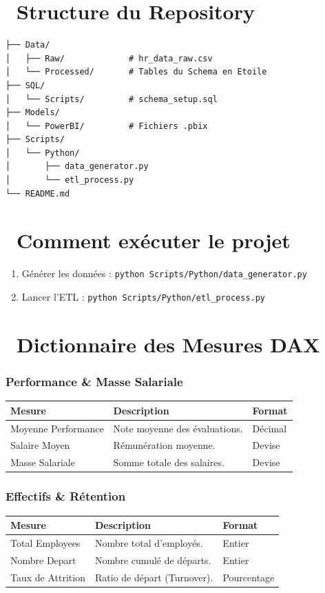 \documentclass[11pt, a4paper]{article}
\begin{document}
\section*{\faFolderOpen \ Structure du Repository}
\begin{lstlisting}[basicstyle=\ttfamily\small, frame=single]
├── Data/                
│   ├── Raw/             # hr_data_raw.csv
│   └── Processed/       # Tables du Schema en Etoile
├── SQL/                 
│   └── Scripts/         # schema_setup.sql
├── Models/              
│   └── PowerBI/         # Fichiers .pbix
├── Scripts/             
│   └── Python/          
│       ├── data_generator.py
│       └── etl_process.py
└── README.md            
\end{lstlisting}

\section*{\faPlayCircle \ Comment exécuter le projet}
\begin{enumerate}
    \item Générer les données : \texttt{python Scripts/Python/data\_generator.py}
    \item Lancer l'ETL : \texttt{python Scripts/Python/etl\_process.py}
\end{enumerate}

\section*{\faTable \ Dictionnaire des Mesures DAX}

\subsubsection*{Performance \& Masse Salariale}
\begin{tabular}{lp{7cm}l}
\toprule
\textbf{Mesure} & \textbf{Description} & \textbf{Format} \\
\midrule
Moyenne Performance & Note moyenne des évaluations. & Décimal \\
Salaire Moyen & Rémunération moyenne. & Devise \\
Masse Salariale & Somme totale des salaires. & Devise \\
\bottomrule
\end{tabular}

\subsubsection*{Effectifs \& Rétention}
\begin{tabular}{lp{7cm}l}
\toprule
\textbf{Mesure} & \textbf{Description} & \textbf{Format} \\
\midrule
Total Employees & Nombre total d'employés. & Entier \\
Nombre Depart & Nombre cumulé de départs. & Entier \\
Taux de Attrition & Ratio de départ (Turnover). & Pourcentage \\
\bottomrule
\end{tabular}
\end{document}
